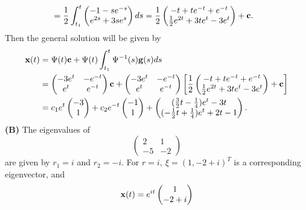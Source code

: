 \documentclass[11pt,a4paper]{article}
\begin{document}
\begin{enumerate}
\begin{align*}
			&= \frac{1}{2}\int_{t_1}^t
			\begin{pmatrix}
				-1 - se^{-s}\\
				e^{2s} + 3se^s
			\end{pmatrix}ds = \frac{1}{2}
			\begin{pmatrix}
				-t + te^{-t} + e^{-t}\\
				\frac{1}{2}e^{2t} + 3te^t - 3e^t
			\end{pmatrix} + \vb{c}.
		\end{align*}
		Then the general solution will be given by
		\begin{align*}
			\vb{x}(t)
			&= \Psi(t)\vb{c} + \Psi(t)\int_{t_1}^t \Psi^{-1}(s)\vb{g}(s)ds\\
			&= 
			\begin{pmatrix}
				-3e^t & -e^{-t}\\
				e^t & e^{-t}
			\end{pmatrix}\vb{c} +
			\begin{pmatrix}
				-3e^t & -e^{-t}\\
				e^t & e^{-t}
			\end{pmatrix}
			\left[
				\frac{1}{2}
				\begin{pmatrix}
					-t + te^{-t} + e^{-t}\\
					\frac{1}{2}e^{2t} + 3te^t - 3e^t
				\end{pmatrix}+ \vb{c}
			\right]\\
			&= c_1e^t
			\begin{pmatrix}
				-3\\
				1
			\end{pmatrix} + c_2e^{-t}
			\begin{pmatrix}
				-1\\
				1
			\end{pmatrix} +
			\begin{pmatrix}
				(\frac{3}{2}t-\frac{1}{4})e^t - 3t\\
				(-\frac{1}{2}t + \frac{1}{4})e^t + 2t -1
			\end{pmatrix}.
		\end{align*}
		\textbf{(B)} The eigenvalues of
		$$
		\begin{pmatrix}
			2 & 1\\
			-5 & -2
		\end{pmatrix}
		$$
		are given by $r_1 = i$ and $r_2 = -i$. For $r = i,\ \xi = (1, -2 + i)^T$ is a corresponding eigenvector, and
		$$
		\vb{x}(t) = e^{it}
		\begin{pmatrix}
			1\\
			-2+i

\end{pmatrix}$$
\end{enumerate}
\end{document}
